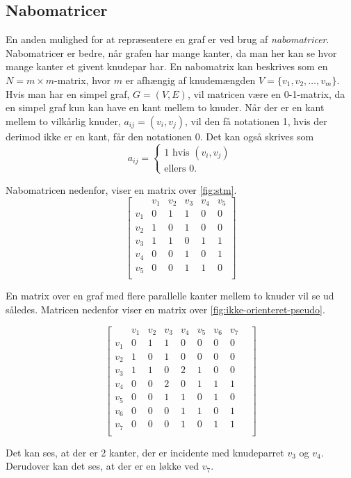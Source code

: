 \subsection{Nabomatricer}
En anden mulighed for at repræsentere en graf er ved brug af \emph{nabomatricer}. Nabomatricer er bedre, når grafen har mange kanter, da man her kan se hvor mange kanter et givent knudepar har.
En nabomatrix kan beskrives som en $N=m \times m$-matrix, hvor $m$ er afhængig af knudemængden $V=\{v_1, v_2, \dotsc, v_m\}$. Hvis man har en simpel graf, $G=(V,E)$, vil matricen være en 0-1-matrix, da en simpel graf kun kan have en kant mellem to knuder. Når der er en kant mellem to  vilkårlig knuder, $a_{ij}=(v_i,v_j)$,  vil den få notationen 1, hvis der derimod ikke er en kant, får den notationen 0.
Det kan også skrives som
\begin{equation}
	a_{ij} =	
	\begin{cases}
		1 \mbox{ hvis } (v_i,v_j) \\
		\mbox{ellers } 0.
	\end{cases}
\end{equation}



Nabomatricen nedenfor, viser en matrix over \autoref{fig:stm}.
\begin{equation}
	\begin{bmatrix}
		&v_1&v_2&v_3&v_4&v_5 \\
		v_1&0&1&1&0&0 \\
		v_2&1&0&1&0&0 \\
		v_3&1&1&0&1&1 \\
		v_4&0&0&1&0&1 \\
		v_5&0&0&1&1&0 \\
	\end{bmatrix}
\end{equation}

En matrix over en graf med flere parallelle kanter mellem to knuder vil se ud således. Matricen nedenfor viser en matrix over \autoref{fig:ikke-orienteret-pseudo}.

\begin{equation}
	\begin{bmatrix}
	&v_1&v_2&v_3&v_4&v_5&v_6&v_7& \\
	v_1&0&1&1&0&0&0&0 \\
	v_2&1&0&1&0&0&0&0 \\
	v_3&1&1&0&2&1&0&0 \\
	v_4&0&0&2&0&1&1&1 \\
	v_5&0&0&1&1&0&1&0 \\
	v_6&0&0&0&1&1&0&1 \\
	v_7&0&0&0&1&0&1&1 \\	
	\end{bmatrix}
\end{equation}

Det kan ses, at der er 2 kanter, der er incidente med knudeparret $v_3$ og $v_4$. Derudover kan det ses, at der er en løkke ved $v_7$.


